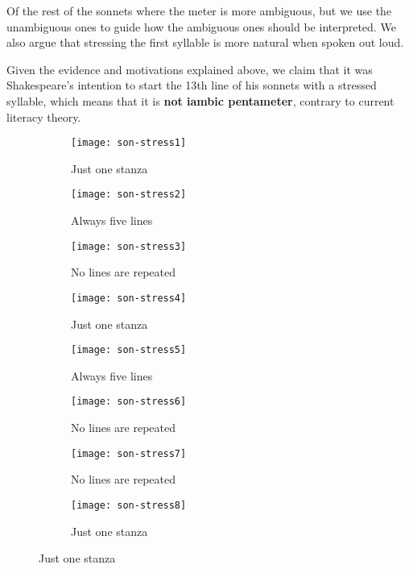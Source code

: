 \begin{description}
Of the rest of the sonnets where the meter is more ambiguous, but we use the unambiguous ones to guide how the ambiguous ones should be interpreted. We also argue that stressing the first syllable is more natural when spoken out loud.

Given the evidence and motivations explained above, we claim that it was Shakespeare's intention to start the 13th line of his sonnets with a stressed syllable, which means that it is \textbf{not iambic pentameter}, contrary to current literacy theory.

\begin{figure}[H]
\centering
\begin{subfigure}[t]{0.5\textwidth}
	\centering
    \texttt{[image: son-stress1]}
    \caption{Just one stanza}
    \label{fig:son-stress1}
\end{subfigure}
\begin{subfigure}[t]{0.5\textwidth}
	\centering
    \texttt{[image: son-stress2]}
    \caption{Always five lines}
    \label{fig:son-stress2}
\end{subfigure}
\begin{subfigure}[t]{0.5\textwidth}
	\centering
    \texttt{[image: son-stress3]}
    \caption{No lines are repeated}
    \label{fig:son-stress3}
\end{subfigure}
\begin{subfigure}[t]{0.5\textwidth}
	\centering
    \texttt{[image: son-stress4]}
    \caption{Just one stanza}
    \label{fig:son-stress4}
\end{subfigure}
\begin{subfigure}[t]{0.5\textwidth}
	\centering
    \texttt{[image: son-stress5]}
    \caption{Always five lines}
    \label{fig:son-stress5}
\end{subfigure}
\begin{subfigure}[t]{0.5\textwidth}
	\centering
    \texttt{[image: son-stress6]}
    \caption{No lines are repeated}
    \label{fig:son-stress6}
\end{subfigure}
\begin{subfigure}[t]{0.5\textwidth}
	\centering
    \texttt{[image: son-stress7]}
    \caption{No lines are repeated}
    \label{fig:son-stress7}
\end{subfigure}
\begin{subfigure}[t]{0.5\textwidth}
	\centering
    \texttt{[image: son-stress8]}
    \caption{Just one stanza}
    \label{fig:son-stress8}
\end{subfigure}

\end{figure}
\end{description}
